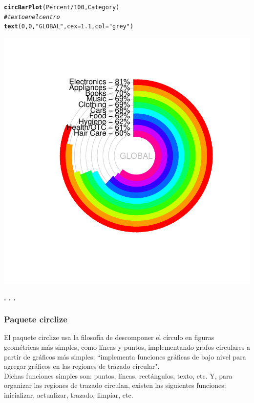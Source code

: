 \documentclass{article}\usepackage[]{graphicx}\usepackage[]{color}
\makeatletter
\def\maxwidth{ %
  \ifdim\Gin@nat@width>\linewidth
    \linewidth
  \else
    \Gin@nat@width
  \fi
}
\newcommand{\hlnum}[1]{\textcolor[rgb]{0.686,0.059,0.569}{#1}}%
\newcommand{\hlstr}[1]{\textcolor[rgb]{0.192,0.494,0.8}{#1}}%
\newcommand{\hlcom}[1]{\textcolor[rgb]{0.678,0.584,0.686}{\textit{#1}}}%
\newcommand{\hlopt}[1]{\textcolor[rgb]{0,0,0}{#1}}%
\newcommand{\hlstd}[1]{\textcolor[rgb]{0.345,0.345,0.345}{#1}}%
\newcommand{\hlkwc}[1]{\textcolor[rgb]{0.333,0.667,0.333}{#1}}%
\newcommand{\hlkwd}[1]{\textcolor[rgb]{0.737,0.353,0.396}{\textbf{#1}}}%
\newenvironment{kframe}{%
 \def\at@end@of@kframe{}%
 \ifinner\ifhmode%
  \def\at@end@of@kframe{\end{minipage}}%
  \begin{minipage}{\columnwidth}%
 \fi\fi%
 \def\FrameCommand##1{\hskip\@totalleftmargin \hskip-\fboxsep
 \colorbox{shadecolor}{##1}\hskip-\fboxsep
     \hskip-\linewidth \hskip-\@totalleftmargin \hskip\columnwidth}%
 \MakeFramed {\advance\hsize-\width
   \@totalleftmargin\z@ \linewidth\hsize
   \@setminipage}}%
 {\par\unskip\endMakeFramed%
 \at@end@of@kframe}
\newenvironment{knitrout}{}{} %
\makeatother
\begin{document}
\begin{knitrout}
\color{fgcolor}\begin{kframe}
\begin{alltt}
\hlkwd{circBarPlot}\hlstd{(Percent}\hlopt{/}\hlnum{100}\hlstd{, Category)}
\hlcom{# texto en el centro}
\hlkwd{text}\hlstd{(}\hlnum{0}\hlstd{,}\hlnum{0}\hlstd{,}\hlstr{"GLOBAL"}\hlstd{,}\hlkwc{cex}\hlstd{=}\hlnum{1.1}\hlstd{,}\hlkwc{col}\hlstd{=}\hlstr{"grey"}\hlstd{)}
\end{alltt}
\end{kframe}

{\centering \includegraphics[width=\maxwidth]{figure/plot_plotrix_cb-1} 

}



\end{knitrout}
\begin{center}
\textbf{. . .}
\end{center}
\subsubsection{Paquete circlize}
El paquete circlize usa la filosof\'ia de descomponer el c\'irculo en figuras geom\'etricas m\'as 
simples, como l\'ineas y puntos, implementando grafos circulares a partir de gr\'aficos m\'as 
simples; ``implementa funciones gr\'aficas de bajo nivel para agregar gr\'aficos en las regiones de 
trazado circular".\cite{docu_circlize}
~\\Dichas funciones simples son: puntos, l\'ineas, rect\'angulos, texto, etc. Y, para organizar las 
regiones de trazado circulan, existen las siguientes funciones: inicializar, actualizar, trazado, 
limpiar, etc.~\\
\end{document}
